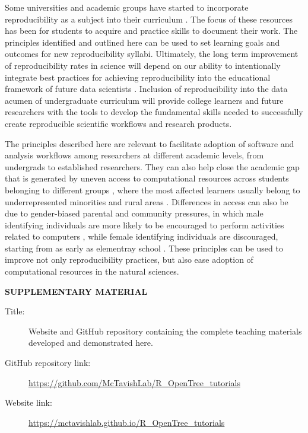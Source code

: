\documentclass[12pt]{article}
\begin{document}
Some universities and academic groups have started to incorporate reproducibility as a subject into their curriculum
\citep{uwlibraries2022, nigms2022, psyteachr2022}.
The focus of these resources has been for students to acquire and practice skills to document their work.
The principles identified and outlined here can be used to set learning goals and outcomes for new reproducibility syllabi.
Ultimately, the long term improvement of reproducibility rates in science will depend on our ability to intentionally integrate best practices for achieving reproducibility into the educational framework of future data scientists \citep{nasem2018data}.
Inclusion of reproducibility into the data acumen of undergraduate curriculum will provide college learners and future researchers with the tools to develop the fundamental skills needed to successfully create reproducible scientific workflows and research products.

The principles described here are relevant to facilitate adoption of software and analysis workflows among researchers at different academic levels, from undergrads to established researchers.
They can also help close the academic gap that is generated by uneven access to computational resources across students belonging to different groups \citep{kewalramani2018student}, where the most affected learners usually belong to underrepresented minorities and rural areas \citep{warner2021quantifying}.
Differences in access can also be due to gender-biased parental and community pressures, in which male identifying individuals are more likely to be encouraged to perform activities related to computers \citep{google2016diversity}, while female identifying individuals are discouraged, starting from as early as elementray school \citep{master_gender_2021}.
These principles can be used to improve not only reproducibility practices, but also ease adoption of computational resources in the natural sciences.


\bigskip
\begin{center}
{\large\bf SUPPLEMENTARY MATERIAL}
\end{center}

\begin{description}

\item[Title:] Website and GitHub repository containing the complete teaching materials developed and demonstrated here.

\item[GitHub repository link:] \url{https://github.com/McTavishLab/R_OpenTree_tutorials}

\item[Website link:] \url{https://mctavishlab.github.io/R_OpenTree_tutorials}

\end{description}


\end{document}
